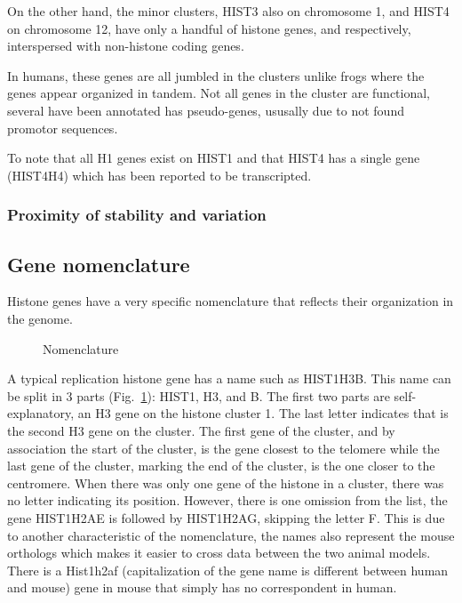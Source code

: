 \documentclass[10pt,a4paper,draft,article]{memoir}
\begin{document}
        On the other hand, the minor clusters, HIST3 also on chromosome 1, and HIST4 on
        chromosome 12, have only a handful of histone genes, \CodingGenesInHistThree{} and
        \CodingGenesInHistFour{} respectively, interspersed with non-histone coding genes.


        In humans, these genes are all jumbled in the clusters unlike
        frogs where the genes appear organized in tandem. Not all genes in the cluster are functional, several have
        been annotated has pseudo-genes, ususally due to not found promotor sequences.

        To note that all H1 genes exist on HIST1 and that HIST4 has a single gene (HIST4H4) which has been reported to be transcripted.




        \subsubsection{Proximity of stability and variation}

    \subsection{Gene nomenclature}

      Histone genes have a very specific nomenclature that reflects their organization in the genome.

      \begin{figure}
        \centering
        \caption{Nomenclature}
        \label{fig:nomenclature}
      \end{figure}

      A typical replication histone gene has a name such as HIST1H3B. This name can be split in
      3 parts (Fig.~\ref{fig:nomenclature}): HIST1, H3, and B. The first two parts are self-explanatory,
      an H3 gene on the histone cluster 1. The last letter indicates that is the second H3 gene on the cluster.
      The first gene of the cluster, and by association the start of the cluster, is the gene closest to the telomere
      while the last gene of the cluster, marking the end of the cluster, is the one closer to the centromere. When
      there was only one gene of the histone in a cluster, there was no letter indicating its position. However, there is
      one omission from the list, the gene HIST1H2AE is followed by HIST1H2AG, skipping the letter F. This is due
      to another characteristic of the nomenclature, the names also represent the mouse orthologs which makes it easier
      to cross data between the two animal models. There is a Hist1h2af (capitalization
      of the gene name is different between human and mouse) gene in mouse that simply has no correspondent in human.
\end{document}
